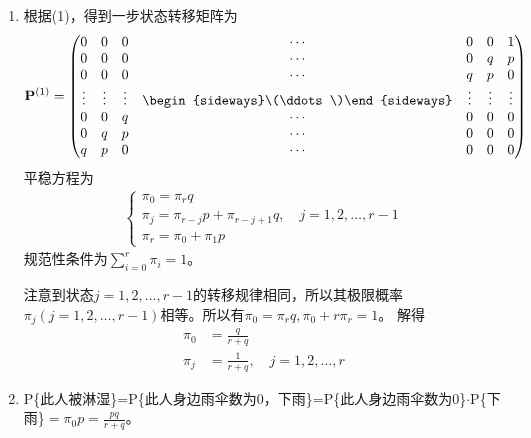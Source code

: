 \begin{enumerate}
\begin{enumerate}[\bfseries (1)]
		      \item 根据(1)，得到一步状态转移矩阵为
		            \begin{align*}
			            \mathbf{P}^{(1)}=\begin{pmatrix}
				                             0      & 0      & 0      & \cdots                                   & 0      & 0      & 1      \\
				                             0      & 0      & 0      & \cdots                                   & 0      & q      & p      \\
				                             0      & 0      & 0      & \cdots                                   & q      & p      & 0      \\
				                             \vdots & \vdots & \vdots & \begin{sideways}\(\ddots\)\end{sideways} & \vdots & \vdots & \vdots \\
				                             0      & 0      & q      & \cdots                                   & 0      & 0      & 0      \\
				                             0      & q      & p      & \cdots                                   & 0      & 0      & 0      \\
				                             q      & p      & 0      & \cdots                                   & 0      & 0      & 0
			                             \end{pmatrix}
		            \end{align*}
		            平稳方程为\begin{align*}
			            \left\{\begin{matrix}
				                   \pi_0=\pi_r q                                         \\
				                   \pi_j=\pi_{r-j}p+\pi_{r-j+1}q,\quad  j=1,2,\ldots,r-1 \\
				                   \pi_r=\pi_0+\pi_1p
			                   \end{matrix}\right.
		            \end{align*}
		            规范性条件为\(\sum_{i=0}^{r}\pi_i=1\)。

		            注意到状态\(j=1,2,\ldots,r-1\)的转移规律相同，所以其极限概率\(\pi_j(j=1,2,\ldots,r-1)\)相等。所以有\(\pi_0=\pi_r q,\pi_0+r\pi_r=1\)。
		            解得
		            \begin{align*}
			            \pi_0 & =\frac{q}{r+q}                      \\
			            \pi_j & =\frac{1}{r+q},\quad j=1,2,\ldots,r
		            \end{align*}
		      \item P\{此人被淋湿\}=P\{此人身边雨伞数为0，下雨\}=P\{此人身边雨伞数为0\}\(\cdot\)P\{下雨\}\(=\pi_0p=\frac{pq}{r+q}\)。


\end{enumerate}
\end{enumerate}
